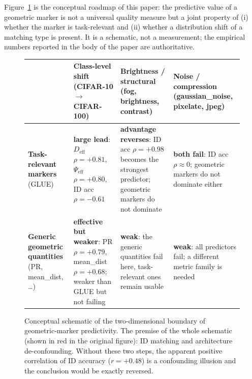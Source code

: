 \documentclass[10pt]{article} %
\begin{document}
Figure~\ref{fig:concept-app} is the conceptual roadmap of this paper: the predictive value of a geometric marker is not a universal quality measure but a joint property of (i) whether the marker is task-relevant and (ii) whether a distribution shift of a matching type is present. It is a schematic, not a measurement; the empirical numbers reported in the body of the paper are authoritative.

\begin{figure}[t]
\centering
\setlength{\tabcolsep}{4pt}
\renewcommand{\arraystretch}{1.35}
\begin{tabular}{@{}p{3.0cm}p{3.6cm}p{3.6cm}p{3.6cm}@{}}
\hline
& Class-level shift (CIFAR-10 $\rightarrow$ CIFAR-100) & Brightness / structural (fog, brightness, contrast) & Noise / compression (gaussian\_noise, pixelate, jpeg) \\
\hline
\textbf{Task-relevant markers} (GLUE) & \textbf{large lead}: $D_{\mathrm{eff}}$ $\rho=+0.81$, $\Psi_{\mathrm{eff}}$ $\rho=+0.80$, ID acc $\rho=-0.61$ & \textbf{advantage reverses}: ID acc $\rho=+0.98$ becomes the strongest predictor; geometric markers do not dominate & \textbf{both fail}: ID acc $\rho \approx 0$; geometric markers do not dominate either \\
\hline
\textbf{Generic geometric quantities} (PR, mean\_dist, \ldots) & \textbf{effective but weaker}: PR $\rho=+0.79$, mean\_dist $\rho=+0.68$; weaker than GLUE but not failing & \textbf{weak}: the generic quantities fail here, task-relevant ones remain usable & \textbf{weak}: all predictors fail; a different metric family is needed \\
\hline
\end{tabular}
\caption{Conceptual schematic of the two-dimensional boundary of geometric-marker predictivity. The premise of the whole schematic (shown in red in the original figure): ID matching and architecture de-confounding. Without these two steps, the apparent positive correlation of ID accuracy ($r = +0.48$) is a confounding illusion and the conclusion would be exactly reversed.}
\label{fig:concept-app}
\end{figure}
\end{document}
